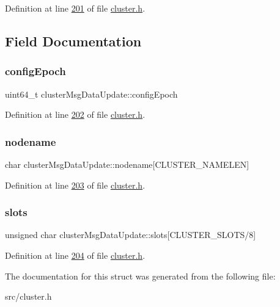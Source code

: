 Definition at line \hyperlink{cluster_8h_source_l00201}{201} of file \hyperlink{cluster_8h_source}{cluster.\+h}.



\subsection{Field Documentation}
\mbox{\label{structclusterMsgDataUpdate_a5ccb48f1cbc2d86aa6665a3d91797fc5}} 
\subsubsection{\texorpdfstring{config\+Epoch}{configEpoch}}
{\footnotesize\ttfamily uint64\+\_\+t cluster\+Msg\+Data\+Update\+::config\+Epoch}



Definition at line \hyperlink{cluster_8h_source_l00202}{202} of file \hyperlink{cluster_8h_source}{cluster.\+h}.

\mbox{\label{structclusterMsgDataUpdate_a506cd14d4ff4d1584e382b98abfed01d}} 
\subsubsection{\texorpdfstring{nodename}{nodename}}
{\footnotesize\ttfamily char cluster\+Msg\+Data\+Update\+::nodename\mbox{[}C\+L\+U\+S\+T\+E\+R\+\_\+\+N\+A\+M\+E\+L\+EN\mbox{]}}



Definition at line \hyperlink{cluster_8h_source_l00203}{203} of file \hyperlink{cluster_8h_source}{cluster.\+h}.

\mbox{\label{structclusterMsgDataUpdate_ad644b488baff5a80184da68dd96234bb}} 
\subsubsection{\texorpdfstring{slots}{slots}}
{\footnotesize\ttfamily unsigned char cluster\+Msg\+Data\+Update\+::slots\mbox{[}C\+L\+U\+S\+T\+E\+R\+\_\+\+S\+L\+O\+TS/8\mbox{]}}



Definition at line \hyperlink{cluster_8h_source_l00204}{204} of file \hyperlink{cluster_8h_source}{cluster.\+h}.



The documentation for this struct was generated from the following file\+:\begin{DoxyCompactItemize}
\item 
src/cluster.\+h\end{DoxyCompactItemize}
